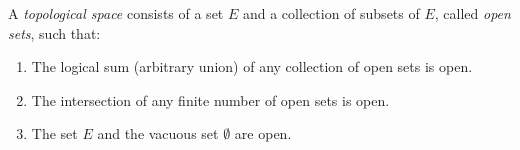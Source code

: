 A \textit{topological space} consists of a set $E$ and a collection of subsets of $E$, called \textit{open sets}, such that:
\begin{enumerate}
\item[1.] The logical sum (arbitrary union) of any collection of open sets is open.
\item[2.] The intersection of any finite number of open sets is open.
\item[3.] The set $E$ and the vacuous set $\emptyset$ are open.
\end{enumerate}
